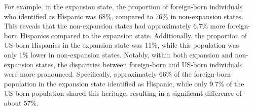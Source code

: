 \documentclass[
]{article}
\begin{document}
For example, in the expansion state, the proportion of foreign-born
individuals who identified as Hispanic was 68\%, compared to 76\% in
non-expansion states. This reveals that the non-expansion states had
approximately 6.7\% more foreign-born Hispanics compared to the
expansion state. Additionally, the proportion of US-born Hispanics in
the expansion state was 11\%, while this population was only 1\% lower
in non-expansion states. Notably, within both expansion and
non-expansion states, the disparities between foreign-born and US-born
individuals were more pronounced. Specifically, approximately 66\% of
the foreign-born population in the expansion state identified as
Hispanic, while only 9.7\% of the US-born population shared this
heritage, resulting in a significant difference of about 57\%.

\renewcommand{\arraystretch}{0.7}

\begingroup\fontsize{6}{8}\selectfont
\end{document}
